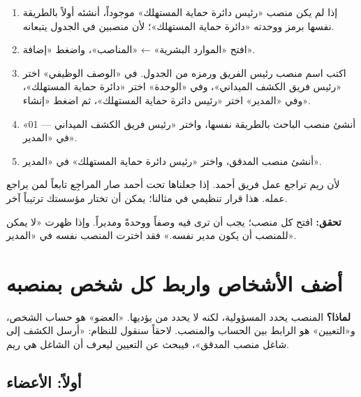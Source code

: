 \begin{enumerate}
\item إذا لم يكن منصب «رئيس دائرة حماية المستهلك» موجوداً، أنشئه أولاً بالطريقة نفسها برمز  ووحدته «دائرة حماية المستهلك»؛ لأن منصبين في الجدول يتبعانه.
\item افتح «الموارد البشرية» ← «المناصب»، واضغط «إضافة».
\item اكتب اسم منصب رئيس الفريق ورمزه من الجدول. في «الوصف الوظيفي» اختر «رئيس فريق الكشف الميداني»، وفي «الوحدة» اختر «دائرة حماية المستهلك»، وفي «المدير» اختر «رئيس دائرة حماية المستهلك»، ثم اضغط «إنشاء».
\item أنشئ منصب الباحث بالطريقة نفسها، واختر «رئيس فريق الكشف الميداني — 01» في «المدير».
\item أنشئ منصب المدقق، واختر «رئيس دائرة حماية المستهلك» في «المدير».
\end{enumerate}

\begin{rcnote}
لأن ريم تراجع عمل فريق أحمد. إذا جعلناها تحت أحمد صار المراجِع تابعاً لمن يراجع عمله. هذا قرار تنظيمي في مثالنا؛ يمكن أن تختار مؤسستك ترتيباً آخر.
\end{rcnote}

\textbf{تحقق:} افتح كل منصب؛ يجب أن ترى فيه وصفاً ووحدةً ومديراً. وإذا ظهرت «لا يمكن للمنصب أن يكون مدير نفسه.» فقد اخترت المنصب نفسه في «المدير».

\section{أضف الأشخاص واربط كل شخص بمنصبه}
\label{sec:build-members}

\textbf{لماذا؟} المنصب يحدد المسؤولية، لكنه لا يحدد من يؤديها. «العضو» هو حساب الشخص، و«التعيين» هو الرابط بين الحساب والمنصب. لاحقاً سنقول للنظام: «أرسل الكشف إلى شاغل منصب المدقق»، فيبحث عن التعيين ليعرف أن الشاغل هي ريم.

\subsection{أولاً: الأعضاء}

